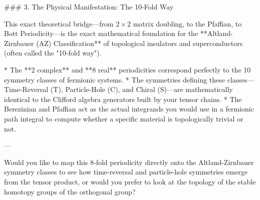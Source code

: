 ### 3. The Physical Manifestation: The 10-Fold Way

This exact theoretical bridge—from $2 \times 2$ matrix doubling, to the Pfaffian, to Bott Periodicity—is the exact mathematical foundation for the **Altland-Zirnbauer (AZ) Classification** of topological insulators and superconductors (often called the "10-fold way").

* The **2 complex** and **8 real** periodicities correspond perfectly to the 10 symmetry classes of fermionic systems.
* The symmetries defining these classes—Time-Reversal (T), Particle-Hole (C), and Chiral (S)—are mathematically identical to the Clifford algebra generators built by your tensor chains.
* The Berezinian and Pfaffian act as the actual integrands you would use in a fermionic path integral to compute whether a specific material is topologically trivial or not.

---

Would you like to map this 8-fold periodicity directly onto the Altland-Zirnbauer symmetry classes to see how time-reversal and particle-hole symmetries emerge from the tensor product, or would you prefer to look at the topology of the stable homotopy groups of the orthogonal group?

